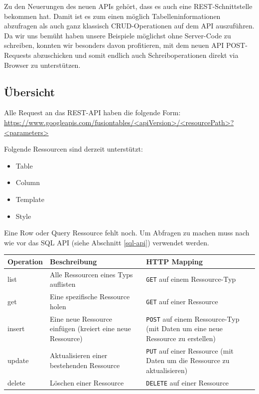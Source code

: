 Zu den Neuerungen des neuen APIs gehört, dass es auch eine REST-Schnittstelle\cite{rest} bekommen hat. Damit ist es zum einen möglich Tabelleninformationen abzufragen als auch ganz klassisch CRUD-Operationen auf dem API auszuführen. Da wir uns bemüht haben unsere Beispiele möglichst ohne Server-Code zu schreiben, konnten wir besonders davon profitieren, mit dem neuen API POST-Requests abzuschicken und somit endlich auch Schreiboperationen direkt via Browser zu unterstützen. 

\subsection{Übersicht}
Alle Request an das REST-API haben die folgende Form:
\url{https://www.googleapis.com/fusiontables/<apiVersion>/<resourcePath>?<parameters>}

Folgende Ressourcen sind derzeit unterstützt:
\begin{itemize}
	\item Table
	\item Column
	\item Template
	\item Style
\end{itemize}

Eine Row oder Query Ressource fehlt noch. Um Abfragen zu machen muss nach wie vor das SQL API (siehe Abschnitt \ref{sql-api}) verwendet werden.

\begin{tabular}{|l|p{6cm}|p{7.5cm}|}
\hline 
\textbf{Operation} & \textbf{Beschreibung} & \textbf{HTTP Mapping} \\ 
\hline 
list & Alle Ressourcen eines Typs auflisten & \texttt{GET} auf einem Ressource-Typ\\ 
\hline 
get	 & Eine spezifische Ressource holen	& \texttt{GET} auf einer Ressource\\
\hline 
insert & Eine neue Ressource einfügen (kreiert eine neue Ressource) & \texttt{POST} auf einem Ressource-Typ (mit Daten um eine neue Ressource zu erstellen)\\
\hline 
update & Aktualisieren einer bestehenden Ressource & \texttt{PUT} auf einer Ressource (mit Daten um die Ressource zu aktualisieren)\\
\hline 
delete & Löschen einer Ressource & \texttt{DELETE}  auf einer Ressource\\
\hline 
\end{tabular}

